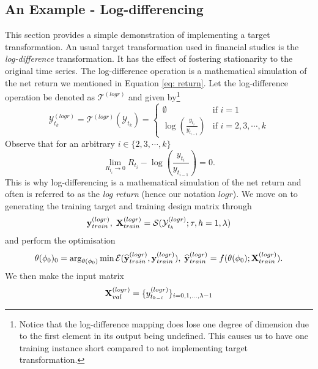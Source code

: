 \subsection{An Example - Log-differencing}\label{subsec: log-diff transformation}
This section provides a simple demonstration of implementing a target transformation. An usual target transformation used in financial studies is the \textit{log-difference} transformation. It has the effect of fostering stationarity to the original time series. The log-difference operation is a mathematical simulation of the net return we mentioned in Equation \ref{eq: return}. Let the log-difference operation be denoted as $\mathcal{T}^{(logr)}$ and given by\footnote{Notice that the log-difference mapping does lose one degree of dimension due to the first element in its output being undefined. This causes us to have one training instance short compared to not implementing target transformation.}
\begin{equation}\label{eq: log-differencing}
    \mathcal{Y}^{(logr)}_{t_k} = \mathcal{T}^{(logr)}(\mathcal{Y}_{t_k}) = \begin{cases}
        \emptyset                  &\text{if $i = 1$} \\
        \log(\frac{y_{t_i}}{y_{t_{i-1}}})  &\text{if $i = 2, 3, \cdots, k$}
    \end{cases}
\end{equation}
Observe that for an arbitrary $i \in \{2, 3, \cdots, k \}$
\begin{equation*}
    \lim_{R_{t_i} \rightarrow 0}{R_{t_i} - \log(\frac{y_{t_i}}{y_{t_{i-1}}}) = 0}.
\end{equation*}
This is why log-differencing is a mathematical simulation of the net return and often is referred to as the \textit{log return} (hence our notation $logr$). We move on to generating the training target and training design matrix through
\begin{equation*}
    \mathbf{y}^{(logr)}_{train}, \; \mathbf{X}^{(logr)}_{train} = \mathcal{S}(\mathcal{Y}^{(logr)}_{t_k}; \tau, h=1, \lambda)
\end{equation*}
and perform the optimisation
\begin{equation*}
    \theta(\phi_0)_0 = \arg_{\theta(\phi_0)} \min \mathcal{E}(\widehat{\mathbf{y}}^{(logr)}_{train}, \mathbf{y}^{(logr)}_{train}), \; \widehat{\mathbf{y}}^{(logr)}_{train} = f(\theta(\phi_0); \mathbf{X}^{(logr)}_{train}).
\end{equation*}
We then make the input matrix
\begin{equation*}
    \mathbf{X}^{(logr)}_{val} = \{y^{(logr)}_{t_{k-i}} \}_{i = 0, 1, \ldots, \lambda-1}
\end{equation*}
